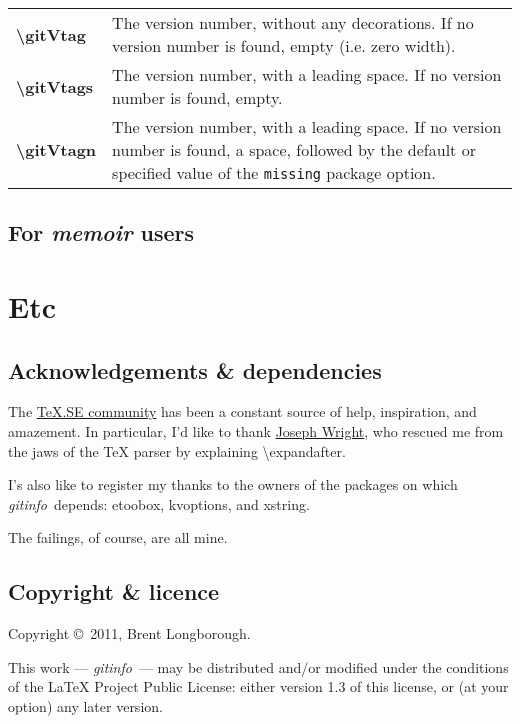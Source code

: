 \documentclass[a4paper,12pt,twoside,openany]{memoir}
\newcommand{\sfit}[1]{\textit{#1}}
\newcommand{\tpname}{\sfit{gitinfo}}
\begin{document}
\noindent
\begin{tabularx}{\textwidth}{@{}>{\ttfamily\bfseries\textbackslash}lX@{}}
gitVtag&
    The version number, without any decorations. If no version number is found,
    empty (i.e. zero width).
\\
gitVtags&
    The version number, with a leading space. If no version number is found,
    empty.
\\
gitVtagn&
    The version number, with a leading space.
    If no version number is found, a space,
    followed by the default or specified value of
    the \texttt{missing} package option.
\\
\end{tabularx}

\section{For \textsf{\itshape memoir} users}
\chapter{Etc}
\section{Acknowledgements \& dependencies}

The \href{http://tex.stackexchange.com}{\TeX.SE community}
has been a constant source of help, inspiration, and amazement.
In particular, I'd like to thank
\href{http://tex.stackexchange.com/users/73/joseph-wright}{Joseph Wright},
who rescued me from the jaws of the TeX parser by explaining
\textbackslash expandafter.

I's also like to register my thanks to the owners of the packages on which
\tpname\ depends: etoobox, kvoptions, and xstring.

The failings, of course, are all mine.
\section{Copyright \& licence}
Copyright \copyright\ 2011, Brent Longborough.

This work --- \tpname\ --- may be distributed and/or modified under the
conditions of the LaTeX Project Public License: either version 1.3
of this license, or (at your option) any later version.
\end{document}
